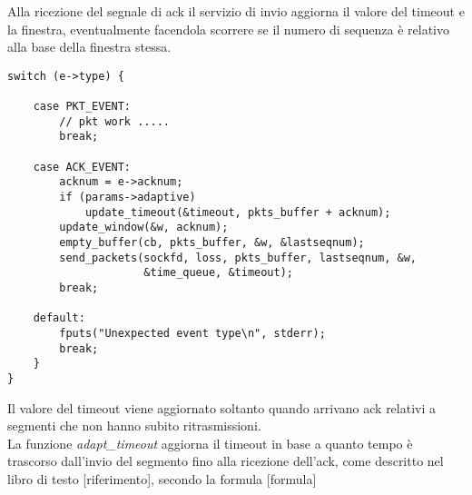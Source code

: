 Alla ricezione del segnale di ack il servizio di invio aggiorna il valore 
del timeout e la finestra, eventualmente facendola scorrere se il numero
di sequenza è relativo alla base della finestra stessa.
\begin{lstlisting}[title=transport.c]
switch (e->type) {

    case PKT_EVENT:
        // pkt work .....
        break;

    case ACK_EVENT:
        acknum = e->acknum;
        if (params->adaptive)
            update_timeout(&timeout, pkts_buffer + acknum);
        update_window(&w, acknum);
        empty_buffer(cb, pkts_buffer, &w, &lastseqnum);
        send_packets(sockfd, loss, pkts_buffer, lastseqnum, &w,
                     &time_queue, &timeout);
        break;

    default:
        fputs("Unexpected event type\n", stderr);
        break;
    }
}
\end{lstlisting}
Il valore del timeout viene aggiornato soltanto quando arrivano ack relativi
a segmenti che non hanno subito ritrasmissioni.\\
La funzione \emph{adapt\_timeout} aggiorna il timeout in base a quanto tempo
è trascorso dall'invio del segmento fino alla ricezione dell'ack, come
descritto nel libro di testo [riferimento], secondo la formula [formula]


